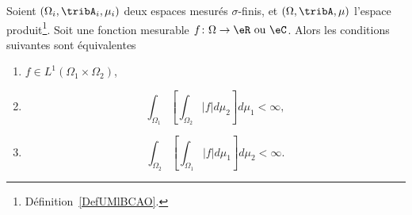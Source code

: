\begin{corollary}           \label{CorTKZKwP}
    Soient \( (\Omega_i,\tribA_i,\mu_i)\) deux espaces mesurés \( \sigma\)-finis, et \( (\Omega,\tribA,\mu)\) l'espace produit\footnote{Définition~\ref{DefUMlBCAO}.}. Soit une fonction mesurable \( f\colon \Omega\to \eR\text{ ou }\eC\). Alors les conditions suivantes sont équivalentes
    \begin{enumerate}
        \item   \label{ITEMooZRAXooTRDIlZ}
            \( f\in L^1(\Omega_1\times \Omega_2)\),
        \item       \label{ITEMooJMPLooZKwxQC}
            \begin{equation}
                \int_{\Omega_1}\left[ \int_{\Omega_2}| f |d\mu_2 \right]d\mu_1 <\infty,
            \end{equation}
        \item   \label{ITEMooLLBCooTRycwG}
            \begin{equation}
                \int_{\Omega_2}\left[ \int_{\Omega_1}| f |d\mu_1 \right]d\mu_2 <\infty.
            \end{equation}
    \end{enumerate}
\end{corollary}

